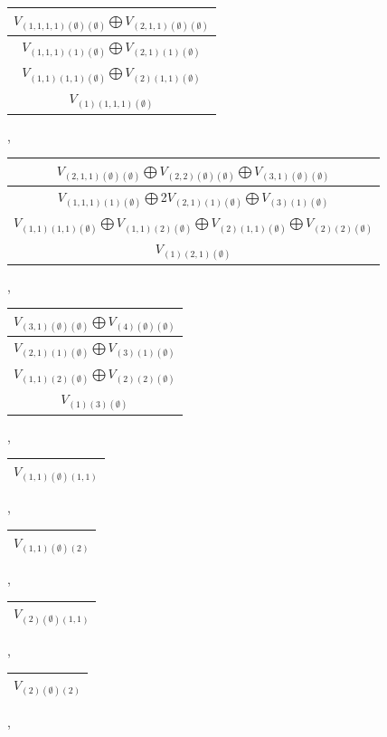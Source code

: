 \documentclass[letterpaper,11pt]{article}
\begin{document}
	\begin{tabular}{| c |}
		\hline
		$V_{(1,1,1,1)(\emptyset)(\emptyset)}$$\bigoplus$$V_{(2,1,1)(\emptyset)(\emptyset)}$\\
		\hline
		$V_{(1,1,1)(1)(\emptyset)}$$\bigoplus$$V_{(2,1)(1)(\emptyset)}$\\
		\hline
		$V_{(1,1)(1,1)(\emptyset)}$$\bigoplus$$V_{(2)(1,1)(\emptyset)}$\\
		\hline
		$V_{(1)(1,1,1)(\emptyset)}$\\
		\hline
	\end{tabular}, 
	\newline 
	\begin{tabular}{| c |}
		\hline
		$V_{(2,1,1)(\emptyset)(\emptyset)}$$\bigoplus$$V_{(2,2)(\emptyset)(\emptyset)}$$\bigoplus$$V_{(3,1)(\emptyset)(\emptyset)}$\\
		\hline
		$V_{(1,1,1)(1)(\emptyset)}$$\bigoplus$2$V_{(2,1)(1)(\emptyset)}$$\bigoplus$$V_{(3)(1)(\emptyset)}$\\
		\hline
		$V_{(1,1)(1,1)(\emptyset)}$$\bigoplus$$V_{(1,1)(2)(\emptyset)}$$\bigoplus$$V_{(2)(1,1)(\emptyset)}$$\bigoplus$$V_{(2)(2)(\emptyset)}$\\
		\hline
		$V_{(1)(2,1)(\emptyset)}$\\
		\hline
	\end{tabular}, 
	\begin{tabular}{| c |}
		\hline
		$V_{(3,1)(\emptyset)(\emptyset)}$$\bigoplus$$V_{(4)(\emptyset)(\emptyset)}$\\
		\hline
		$V_{(2,1)(1)(\emptyset)}$$\bigoplus$$V_{(3)(1)(\emptyset)}$\\
		\hline
		$V_{(1,1)(2)(\emptyset)}$$\bigoplus$$V_{(2)(2)(\emptyset)}$\\
		\hline
		$V_{(1)(3)(\emptyset)}$\\
		\hline
	\end{tabular}, 
	\begin{tabular}{| c |}
		\hline
		$V_{(1,1)(\emptyset)(1,1)}$\\
		\hline
	\end{tabular}, 
	\begin{tabular}{| c |}
		\hline
		$V_{(1,1)(\emptyset)(2)}$\\
		\hline
	\end{tabular}, 
	\begin{tabular}{| c |}
		\hline
		$V_{(2)(\emptyset)(1,1)}$\\
		\hline
	\end{tabular}, 
	\begin{tabular}{| c |}
		\hline
		$V_{(2)(\emptyset)(2)}$\\
		\hline
	\end{tabular}, 
\end{document}
